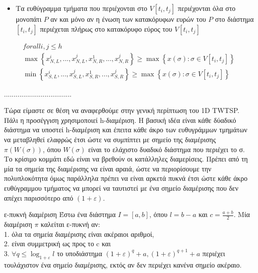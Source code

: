 \documentclass[oneside,12pt]{book}
\theoremstyle{definition}
\begin{document}
\begin{itemize}
	\item Τα ευθύγραμμα τμήματα που περιέχονται στο \(V[t_i, t_j]\) περιέχονται όλα στο μονοπάτι \(P\) αν και μόνο αν η ένωση των κατακόρυφων ευρών του \(P\) στο διάστημα \([t_i, t_j]\) περιέχεται πλήρως στο κατακόρυφο εύρος του \(V[t_i, t_j]\)
\end{itemize}

\begin{align*}
forall i,j \leq h \\
\max \left\{ x^{i}_{N,L},...,x^{j}_{N,L}, x^{1}_{N,R},...,x^{j}_{N,R} \right\} \geq \max \left\{ x(σ): σ \in V[t_i, t_j] \right\} \\
\min \left\{ x^{i}_{S,L},...,x^{j}_{S,L}, x^{1}_{S,R},...,x^{j}_{S,R} \right\} \geq \max \left\{ x(σ): σ \in V[t_i, t_j] \right\}
\end{align*}

...................................

Τώρα είμαστε σε θέση να αναφερθούμε στην γενική περίπτωση του 1D TWTSP. \\
Πάλι η προσέγγιση χρησιμοποιεί h-διαμέριση. Η βασική ιδέα είναι κάθε δύαδικό διάστημα να υποστεί h-διαμέριση και έπειτα κάθε άκρο των ευθυγράμμων τμημάτων να μεταβληθεί ελαφρώς έτσι ώστε να συμπίπτει με σημείο της διαμέρισης \(π(W(σ))\), όπου \(W(σ)\) είναι το ελάχιστο δυαδικό διάστημα που περιέχει το σ. \\
Το κρίσιμο κομμάτι εδώ είναι να βρεθούν οι κατάλληλες διαμερίσεις. Πρέπει από τη μία τα σημεία της διαμέρισης να είναι αραιά, ώστε να περιορίσουμε την πολυπλοκότητα όμως παράλληλα πρέπει να είναι αρκετά πυκνά έτσι ώστε κάθε άκρο ευθύγραμμου τμήματος να μπορεί να ταυτιστεί με ένα σημείο διαμέρισης που δεν απέχει παρισσότερο από \((1+ε)\). \\

\begin{mydefinition}{ε-πυκνή διαμέριση}{}
	Έστω ένα διάστημα \(I = [a,b]\), όπου \(l = b - a\) και \(c = \frac{a+b}{2}\). Μία διαμέριση \(π\) καλείται ε-πυκνή αν: \\
	1. όλα τα σημεία διαμέρισης είναι ακέραιοι αριθμοί, \\
	2. είναι συμμετρική ως προς το c και \\
	3. \(\forall q \leq \log_{1+ε} l\) το υποδιάστημα \((1+ε)^q + a, (1+ε)^{q+1} + a\) περιέχει τουλάχιστον ένα σημείο διαμέρισης, εκτός αν δεν περιέχει κανένα σημείο ακέραιο.
\end{mydefinition}
\end{document}
